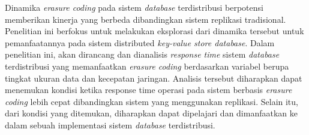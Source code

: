 Dinamika \textit{erasure coding} pada sistem \textit{database} terdistribusi berpotensi memberikan kinerja yang berbeda dibandingkan sistem replikasi tradisional. Penelitian ini berfokus untuk melakukan eksplorasi dari dinamika tersebut untuk pemanfaatannya pada sistem distributed \textit{key-value store database}. Dalam penelitian ini, akan dirancang dan dianalisis \textit{response time} sistem \textit{database} terdistribusi yang memanfaatkan \textit{erasure coding} berdasarkan variabel berupa tingkat ukuran data dan kecepatan jaringan. Analisis tersebut diharapkan dapat menemukan kondisi ketika response time operasi pada sistem berbasis \textit{erasure coding} lebih cepat dibandingkan sistem yang menggunakan replikasi. Selain itu, dari kondisi yang ditemukan, diharapkan dapat dipelajari dan dimanfaatkan ke dalam sebuah implementasi sistem \textit{database} terdistribusi.
